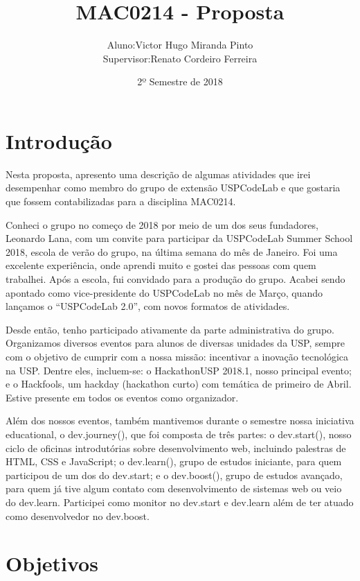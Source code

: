 \documentclass[10pt,twoside,a4paper]{article}
\title{MAC0214 - Proposta}
\author{
  \begin{tabular}{rl}
    Aluno:      & Victor Hugo Miranda Pinto \\
    Supervisor: & Renato Cordeiro Ferreira
  \end{tabular}
}
\date{2º Semestre de 2018}
\begin{document}
\maketitle

\section{Introdução}

    Nesta proposta, apresento uma descrição de algumas atividades que irei desempenhar como membro do grupo de extensão USPCodeLab e que gostaria que fossem contabilizadas para a disciplina MAC0214.
    
    Conheci o grupo no começo de 2018 por meio de um dos seus fundadores, Leonardo Lana, com um convite para participar da USPCodeLab Summer School 2018, escola de verão do grupo, na última semana do mês de Janeiro. Foi uma excelente experiência, onde aprendi muito e gostei das pessoas com quem trabalhei. Após a escola, fui convidado para a produção do grupo. Acabei sendo apontado como vice-presidente do USPCodeLab no mês de Março, quando lançamos o “USPCodeLab 2.0”, com novos formatos de atividades. 
    
    Desde então, tenho participado ativamente da parte administrativa do grupo. Organizamos diversos eventos para alunos de diversas unidades da USP, sempre com o objetivo de cumprir com a nossa missão: incentivar a inovação tecnológica na USP. Dentre eles, incluem-se: o HackathonUSP 2018.1, nosso principal evento; e o Hackfools, um hackday (hackathon curto) com temática de primeiro de Abril. Estive presente em todos os eventos como organizador.

    Além dos nossos eventos, também mantivemos durante o semestre nossa iniciativa educational, o dev.journey(), que foi composta de três partes: o dev.start(), nosso ciclo de oficinas introdutórias sobre desenvolvimento web, incluindo palestras de HTML, CSS e JavaScript; o dev.learn(), grupo de estudos iniciante, para quem participou de um dos do dev.start; e o dev.boost(), grupo de estudos avançado, para quem já tive algum contato com desenvolvimento de sistemas web ou veio do dev.learn. Participei como monitor no dev.start e dev.learn além de ter atuado como desenvolvedor no dev.boost.



\section{Objetivos}
\end{document}
